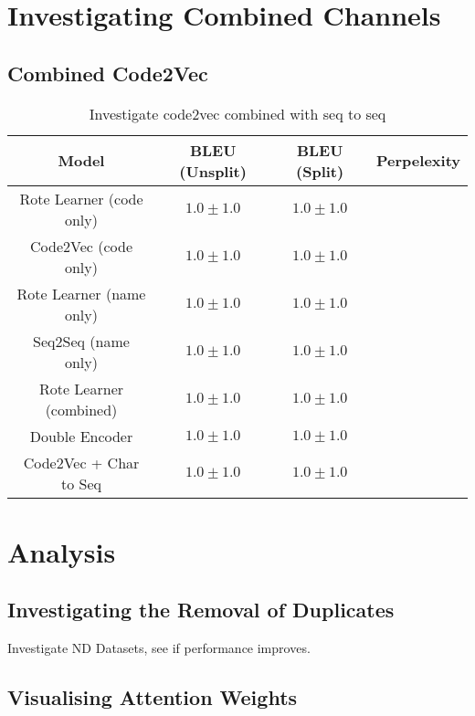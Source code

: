 \section{Investigating Combined Channels} %
\label{sec:investigating_combined_channels}

\subsection{Combined Code2Vec } %
\label{sub:combined_code2vec}


\begin{table}[h!]
\begin{center}
\begin{tabular}{ c | c | c | c }
    Model                             & BLEU (Unsplit)  & BLEU (Split)    & Perpelexity \\
    \hline
    Rote Learner  (code only)         & $1.0 \pm 1.0 $  & $1.0 \pm 1.0 $  &  \\
    Code2Vec  (code only)             & $1.0 \pm 1.0 $  & $1.0 \pm 1.0 $  &  \\
    \hline
    \hline
    Rote Learner  (name only)         & $1.0 \pm 1.0 $  & $1.0 \pm 1.0 $  &  \\
    Seq2Seq  (name only)              & $1.0 \pm 1.0 $  & $1.0 \pm 1.0 $  &  \\
    \hline
    \hline
    Rote Learner (combined)           & $1.0 \pm 1.0 $  & $1.0 \pm 1.0 $  & \\
    Double Encoder                    & $1.0 \pm 1.0 $  & $1.0 \pm 1.0 $  &  \\
    Code2Vec  + Char to Seq           & $1.0 \pm 1.0 $  & $1.0 \pm 1.0 $  &  \\
    \hline
\end{tabular}
\caption {Investigate code2vec combined with seq to seq}
\label{table:code2vec_embed}
\end{center}
\end{table}





\section{Analysis} %
\label{sec:analysis}


\subsection{Investigating the Removal of Duplicates} %
\label{sub:investigating_the_removal_of_duplicates}

Investigate ND Datasets, see if performance improves.

\subsection{Visualising Attention Weights} %
\label{sub:visualising_attention_weights}

